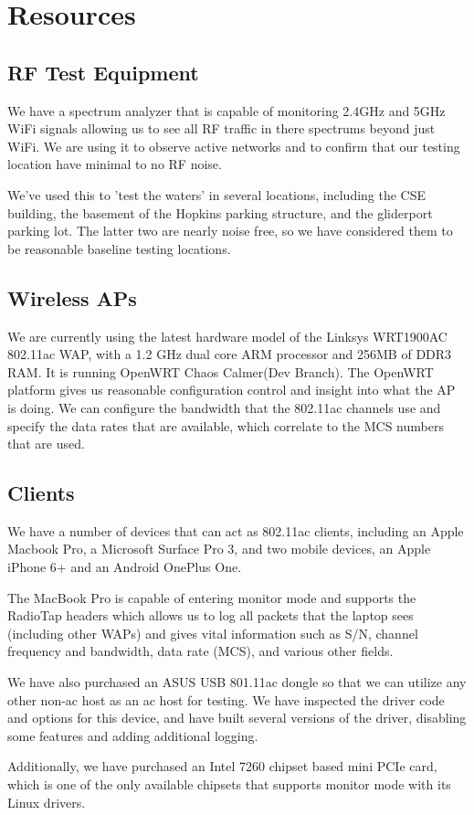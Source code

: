 \section{Resources}

\subsection{RF Test Equipment}

We have a spectrum analyzer that is capable of monitoring 2.4GHz and
5GHz WiFi signals allowing us to see all RF traffic in there spectrums
beyond just WiFi. We are using it to observe active networks and to
confirm that our testing location have minimal to no RF noise.

We've used this to 'test the waters' in several locations, including
the CSE building, the basement of the Hopkins parking structure, and
the gliderport parking lot. The latter two are nearly noise free, so
we have considered them to be reasonable baseline testing locations.

\subsection{Wireless APs}

We are currently using the latest hardware model of the Linksys
WRT1900AC 802.11ac WAP, with a 1.2 GHz dual core ARM processor and
256MB of DDR3 RAM. It is running OpenWRT Chaos Calmer(Dev Branch). The
OpenWRT platform gives us reasonable configuration control and insight
into what the AP is doing. We can configure the bandwidth that the
802.11ac channels use and specify the data rates that are available,
which correlate to the MCS numbers that are used.

\subsection{Clients}

We have a number of devices that can act as 802.11ac clients,
including an Apple Macbook Pro, a Microsoft Surface Pro 3, and two
mobile devices, an Apple iPhone 6+ and an Android OnePlus One.

The MacBook Pro is capable of entering monitor mode and supports the RadioTap
headers which allows us to log all packets that the laptop sees (including other WAPs)
and gives vital information such as S/N, channel frequency and bandwidth, data rate (MCS),
and various other fields.

We have also purchased an ASUS USB 801.11ac dongle so that we can
utilize any other non-ac host as an ac host for testing. We have
inspected the driver code and options for this device, and have built
several versions of the driver, disabling some features and adding
additional logging.

Additionally, we have  purchased an Intel 7260 chipset based mini PCIe
card, which is one of the only available chipsets that supports
monitor mode with its Linux drivers.

